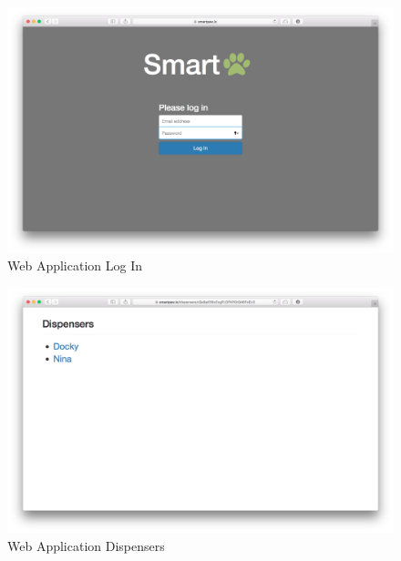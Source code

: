 \documentclass[12pt]{article}
\begin{document}
\begin{appendix}
  \begin{figure}[!htb]
    \begin{center}
        \includegraphics[scale=0.15]{Figures/WebApp1.png}
    \end{center}
    \caption{Web Application Log In}
    \label{fig:WebApp1}
  \end{figure}

  \begin{figure}[!htb]
    \begin{center}
        \includegraphics[scale=0.15]{Figures/WebApp2.png}
    \end{center}
    \caption{Web Application Dispensers}
    \label{fig:WebApp2}
  \end{figure}


\end{appendix}
\end{document}
